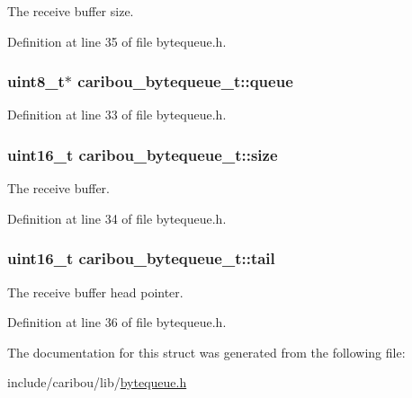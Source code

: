 The receive buffer size. 



Definition at line 35 of file bytequeue.\-h.

\hypertarget{structcaribou__bytequeue__t_a4a4aa3f8ed5e7e7e66f7da7a2cb7720e}{
\subsubsection[{queue}]{\setlength{\rightskip}{0pt plus 5cm}uint8\-\_\-t$\ast$ caribou\-\_\-bytequeue\-\_\-t\-::queue}}\label{structcaribou__bytequeue__t_a4a4aa3f8ed5e7e7e66f7da7a2cb7720e}


Definition at line 33 of file bytequeue.\-h.

\hypertarget{structcaribou__bytequeue__t_a0f88b0ee081def2ac171173e3e520980}{
\subsubsection[{size}]{\setlength{\rightskip}{0pt plus 5cm}uint16\-\_\-t caribou\-\_\-bytequeue\-\_\-t\-::size}}\label{structcaribou__bytequeue__t_a0f88b0ee081def2ac171173e3e520980}


The receive buffer. 



Definition at line 34 of file bytequeue.\-h.

\hypertarget{structcaribou__bytequeue__t_a566eaeca029373cd7f187cc2e622b3f8}{
\subsubsection[{tail}]{\setlength{\rightskip}{0pt plus 5cm}uint16\-\_\-t caribou\-\_\-bytequeue\-\_\-t\-::tail}}\label{structcaribou__bytequeue__t_a566eaeca029373cd7f187cc2e622b3f8}


The receive buffer head pointer. 



Definition at line 36 of file bytequeue.\-h.



The documentation for this struct was generated from the following file\-:\begin{DoxyCompactItemize}
\item 
include/caribou/lib/\hyperlink{bytequeue_8h}{bytequeue.\-h}\end{DoxyCompactItemize}
